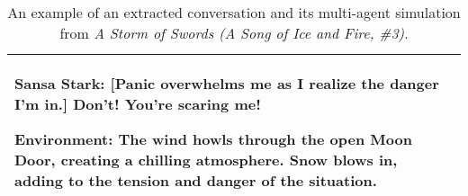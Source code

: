 \begin{table*}[h]
{\begin{tabular}{p{1in}|p{5.4in}}
    \quad
    
    Sansa Stark: [Panic overwhelms me as I realize the danger I'm in.] Don't! You're scaring me!

    \quad
    
    Environment: The wind howls through the open Moon Door, creating a chilling atmosphere. Snow blows in, adding to the tension and danger of the situation.

\\ 
    
\bottomrule

\end{tabular}}
\caption{An example of an extracted conversation and its multi-agent simulation from \textit{A Storm of Swords (A Song of Ice and Fire, \#3)}. }
\label{tab:case_sansa_2}
\end{table*}

